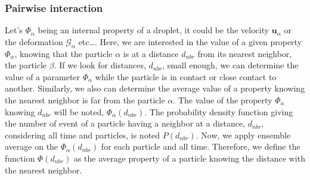 \subsubsection{Pairwise interaction}
Let's $\Phi_\alpha$ being an internal property of a droplet, it could be the velocity $\bm{u}_\alpha$ or the deformation $\mathcal{G}_\alpha$ etc\ldots. 
Here, we are interested in the value of a given property $\Phi_\alpha$, knowing that the particle $\alpha$ is at a distance $d_{nbr}$ from its nearest neighbor, the particle $\beta$.
If we look for distances, $d_{nbr}$, small enough, we can determine the value of a parameter $\Phi_\alpha$ while the particle is in contact or close contact to another.
Similarly, we also can determine the average value of a property knowing the nearest neighbor is far from the particle $\alpha$. 
The value of the property $\Phi_\alpha$ knowing $d_{nbr}$ will be noted, $\Phi_\alpha(d_{nbr})$. 
The probability density function giving the number of event of a particle having a neighbor at a distance, $d_{nbr}$, considering all time and particles, is noted $P(d_{nbr})$.
Now, we apply ensemble average on the $\Phi_\alpha(d_{nbr})$ for each particle and all time.
Therefore, we define the function $\Phi(d_{nbr})$ as the average property of a particle knowing the distance with the nearest neighbor.

